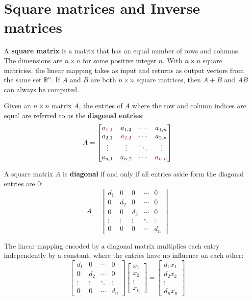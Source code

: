 \documentclass{article}
\newcommand{\dr}[1]{\textcolor{dark_red}{#1}}
\begin{document}
\section*{Square matrices and Inverse matrices}

A {\bf square matrix} is a matrix that has an equal number of rows and columns. The dimensions are \(n \times n\) for some positive integer \(n\). With \(n \times n\) square matricies, the linear mapping takes as input and returns as output vectors from the same set \(\mathbb{R}^n\). If \(A\) and \(B\) are both \(n \times n\) square matrices, then \(A + B\) and \(AB\) can always be computed.

Given an \(n \times n\) matrix \(A\), the entries of \(A\) where the row and column indices are equal are referred to as the {\bf diagonal entries}:
\[A = \begin{bmatrix} 
\dr{a_{1,1}} & a_{1,2} & \cdots & a_{1,n} \\
a_{2,1} & \dr{a_{2,2}} & \cdots & a_{2,n} \\
\vdots & \vdots & \dr{\ddots} & \vdots \\
a_{n,1} & a_{n,2} & \cdots & \dr{a_{n,n}}
\end{bmatrix}\]

A square matrix \(A\) is {\bf diagonal} if and only if all entries aside form the diagonal entries are \(0\):
\[A = \begin{bmatrix} 
d_1 & 0 & 0 & \cdots & 0 \\
0 & d_2 & 0 & \cdots & 0 \\
0 & 0 & d_3 & \cdots & 0 \\
\vdots & \vdots & \vdots & \ddots & \vdots \\
0 & 0 & 0 & \cdots & d_n
\end{bmatrix}\]

The linear mapping encoded by a diagonal matrix multiplies each entry independently by a constant, where the entries have no influence on each other:
\[\begin{bmatrix} 
d_1 & 0 & \cdots & 0 \\
0 & d_2 & \cdots & 0 \\
\vdots & \vdots & \ddots & \vdots \\
0 & 0 & \cdots & d_n
\end{bmatrix} \begin{bmatrix} x_1 \\ x_2 \\ \vdots \\ x_n \end{bmatrix}
= \begin{bmatrix} d_1 x_1 \\ d_2 x_2 \\ \vdots \\ d_n x_n \end{bmatrix}\]
\end{document}
